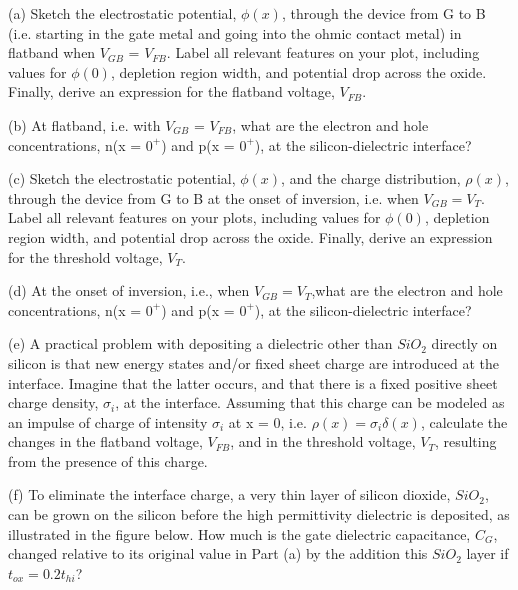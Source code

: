 \documentclass[12 pt]{article}
\begin{document}
(a) Sketch the electrostatic potential, $\phi (x)$, through the device from G to B (i.e. starting in the gate metal and going into the ohmic contact metal) in flatband when $V_{GB}$ = $V_{FB}$. Label all relevant features on your plot, including values for $\phi (0)$, depletion region width, and potential drop across the oxide. Finally, derive an expression for the flatband voltage, $V_{FB}$.  \par

(b)  At flatband, i.e. with $V_{GB}$ = $V_{FB}$, what are the electron and hole concentrations, n(x = $0^{+}$) and p(x = $0^{+}$), at the silicon-dielectric interface? \par

(c) Sketch the electrostatic potential, $\phi(x)$, and the charge distribution, $\rho (x)$, through the device from G to B at the onset of inversion, i.e. when $V_{GB} = V_{T}$. Label all relevant features on your plots, including values for $\phi (0)$, depletion region width, and potential drop across the oxide. Finally, derive an expression for the threshold voltage, $V_{T}$.  \par

(d) At the onset of inversion, i.e., when $V_{GB} = V_{T}$,what are the electron and hole concentrations, n(x = $0^{+}$) and p(x = $0^{+}$), at the silicon-dielectric interface?  \par

(e) A practical problem with depositing a dielectric other than $SiO_{2}$ directly on silicon is that new energy states and/or fixed sheet charge are introduced at the interface. Imagine that the latter occurs, and that there is a fixed positive sheet charge density, $\sigma_{i}$, at the interface. Assuming that this charge can be modeled as an impulse of charge of intensity $\sigma_{i}$ at x = 0, i.e. $\rho(x) = \sigma_{i} \delta(x)$, calculate the changes in the flatband voltage, $V_{FB}$, and in the threshold voltage, $V_{T}$, resulting from the presence of this charge.  \par

(f) To eliminate the interface charge, a very thin layer of silicon dioxide, $SiO_{2}$, can be grown on the silicon before the high permittivity dielectric is deposited, as illustrated in the figure below. How much is the gate dielectric capacitance, $C_{G}$, changed relative to its original value in Part (a) by the addition this $SiO_{2}$ layer if $t_{ox} = 0.2 t_{hi}$?  
\end{document}
